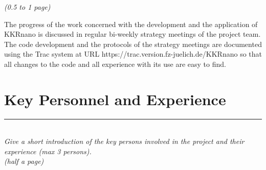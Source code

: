 \documentclass [a4paper, 12pt]{article}
\begin{document}
\textit{(0.5 to 1 page)}




The progress of the work concerned with the development and the application of KKRnano
is discussed in regular bi-weekly strategy meetings of the project team.
The code development and the protocols of the strategy meetings are documented
using the Trac system at URL https://trac.version.fz-juelich.de/KKRnano so
that all changes to the code and all experience with its use are easy to find.


\bigskip

\section{Key Personnel and Experience}
\rule{\textwidth}{0.4pt}\\
\textit{Give a short introduction of the key persons involved in the project and their experience (max 3 persons).}\\

\textit{(half a page)}
\end{document}

